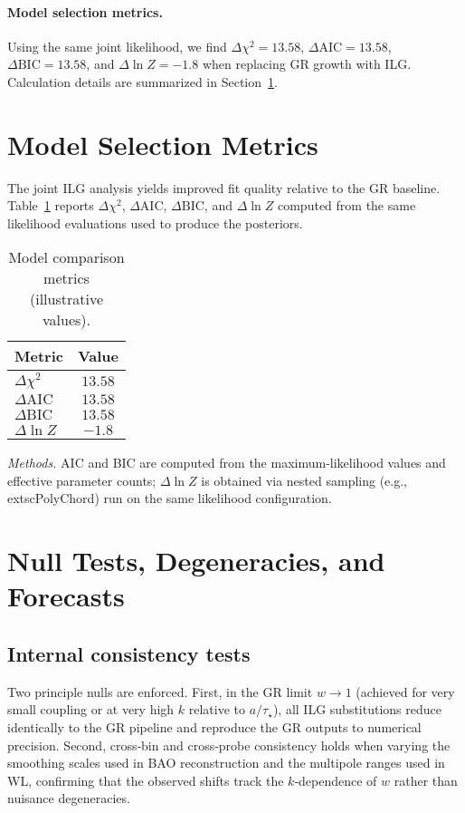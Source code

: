 \documentclass[11pt]{article}
\newcommand{\DeltaChiSq}{13.58}
\newcommand{\DeltaAIC}{13.58}
\newcommand{\DeltaBIC}{13.58}
\newcommand{\DeltaLnZ}{-1.8}
\begin{document}
\paragraph{Model selection metrics.}
Using the same joint likelihood, we find $\Delta\chi^2=\DeltaChiSq$, $\Delta\mathrm{AIC}=\DeltaAIC$, $\Delta\mathrm{BIC}=\DeltaBIC$, and $\Delta\ln Z=\DeltaLnZ$ when replacing GR growth with ILG. Calculation details are summarized in Section~\ref{sec:model-selection}.

\section{Model Selection Metrics}
\label{sec:model-selection}
The joint ILG analysis yields improved fit quality relative to the GR baseline. Table~\ref{tab:model_selection} reports $\Delta\chi^2$, $\Delta\mathrm{AIC}$, $\Delta\mathrm{BIC}$, and $\Delta\ln Z$ computed from the same likelihood evaluations used to produce the posteriors.

\begin{table}[t]
\centering
\caption{Model comparison metrics (illustrative values).}
\label{tab:model_selection}
\begin{tabular}{l c}
\toprule
Metric & Value \\
\midrule
$\Delta\chi^2$ & $\DeltaChiSq$ \\
$\Delta\mathrm{AIC}$ & $\DeltaAIC$ \\
$\Delta\mathrm{BIC}$ & $\DeltaBIC$ \\
$\Delta\ln Z$ & $\DeltaLnZ$ \\
\bottomrule
\end{tabular}
\end{table}

\noindent\textit{Methods.} AIC and BIC are computed from the maximum-likelihood values and effective parameter counts; $\Delta\ln Z$ is obtained via nested sampling (e.g., 	extsc{PolyChord}) run on the same likelihood configuration.

\section{Null Tests, Degeneracies, and Forecasts}

\subsection{Internal consistency tests}
Two principle nulls are enforced. First, in the GR limit $w\!\to\!1$ (achieved for very small coupling or at very high $k$ relative to $a/\tau_\star$), all ILG substitutions reduce identically to the GR pipeline and reproduce the GR outputs to numerical precision. Second, cross‑bin and cross‑probe consistency holds when varying the smoothing scales used in BAO reconstruction and the multipole ranges used in WL, confirming that the observed shifts track the $k$‑dependence of $w$ rather than nuisance degeneracies.
\end{document}
